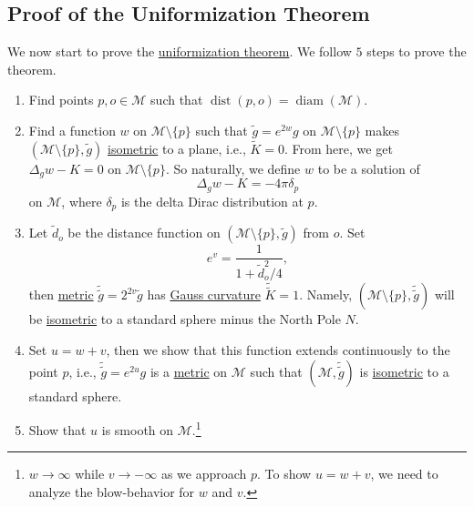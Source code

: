 \subsection{Proof of the Uniformization Theorem}
We now start to prove the \hyperref[thm:uniformization]{uniformization theorem}. We follow \(5\) steps to prove the theorem.
\begin{enumerate}
	\item Find points \(p, o\in \mathcal{M} \) such that \(\mathop{\mathrm{dist}}(p, o) = \mathop{\mathrm{diam}}(\mathcal{M} ) \).
	\item Find a function \(w\) on \(\mathcal{M} \setminus \{ p \} \) such that \(\widetilde{g} = e^{2w} g\) on \(\mathcal{M} \setminus \{ p \} \) makes \((\mathcal{M} \setminus \{ p \} , \widetilde{g} )\) \hyperref[def:isometry]{isometric} to a plane, i.e., \(\widetilde{K} = 0\). From here, we get \(\Delta _g w - K = 0\) on \(\mathcal{M} \setminus \{ p \} \). So naturally, we define \(w\) to be a solution of
	      \[
		      \Delta _g w - K = -4 \pi \delta _p
	      \]
	      on \(\mathcal{M} \), where \(\delta _p\) is the delta Dirac distribution at \(p\).
	\item Let \(\widetilde{d} _o\) be the distance function on \((\mathcal{M} \setminus \{ p \} , \widetilde{g} )\) from \(o\). Set
	      \[
		      e^v = \frac{1}{1 + \widetilde{d} _o^2/4},
	      \]
	      then \hyperref[def:Riemannian-metric]{metric} \(\widetilde{\widetilde{g}} = 2^{2v} \widetilde{g} \) has \hyperref[rmk:Gauss-curvature]{Gauss curvature} \(\widetilde{\widetilde{K}} = 1\). Namely, \((\mathcal{M} \setminus \{ p \} , \widetilde{\widetilde{g}} )\) will be \hyperref[def:isometry]{isometric} to a standard sphere minus the North Pole \(N\).
	\item Set \(u = w + v\), then we show that this function extends continuously to the point \(p\), i.e., \(\widetilde{\widetilde{g}} = e^{2u} g\) is a \hyperref[def:Riemannian-metric]{metric} on \(\mathcal{M} \) such that \((\mathcal{M} , \widetilde{\widetilde{g}} )\) is \hyperref[def:isometry]{isometric} to a standard sphere.
	\item Show that \(u\) is smooth on \(\mathcal{M} \).\footnote{\(w \to \infty \) while \(v \to -\infty \) as we approach \(p\). To show \(u = w + v\), we need to analyze the blow-behavior for \(w\) and \(v\).}
\end{enumerate}